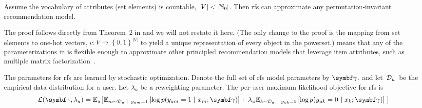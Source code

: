 \begin{prop}
  Assume the vocabulary of attributes (set elements) is countable, $\lvert V \rvert < \lvert \mathbb{N}_0 \rvert$. Then \acrshort{rfs} can approximate any permutation-invariant recommendation model.
  \label{prop:universal-approximation}
\end{prop}
The proof follows directly from Theorem~2 in \citet{zaheer2017deep} and we will not
restate it here. (The only change to the proof is the mapping from set elements
to one-hot vectors, $c \colon V \to \left\{0, 1\right\}^{\lvert V \rvert}$ to
yield a unique representation of every object in the powerset.)
 means that any of the parameterizations in
 is flexible enough to
approximate other principled recommendation models that leverage item
attributes, such as multiple matrix
factorization~\citep{gopalan2014content-based,wang2011collaborative}.%

The parameters for \gls{rfs} are learned by stochastic optimization. Denote
the full set of \gls{rfs} model parameters by $\mbgamma$, and let~$\mathcal{D}_u$~be the
empirical data distribution for a user. Let $\lambda_u$ be a reweighting
parameter. The per-user maximum likelihood objective for \gls{rfs} is
\begin{equation}
  \label{eq:objective}
  \begin{aligned}
  \cL(\mbgamma, \lambda_u) = \E_u\big[ \E_{m \sim \cD_u \mid \yum = 1}%
  \left
  [\log p(\yum =1 \mid x_m; \mbgamma)\right]
  + \lambda_u \E_{k \sim \cD_u \mid \yuk = 0}%
  \left[\log p(\yuk = 0 \mid x_k;
  \mbgamma)\right]
                \big]
  \end{aligned}
\end{equation}

